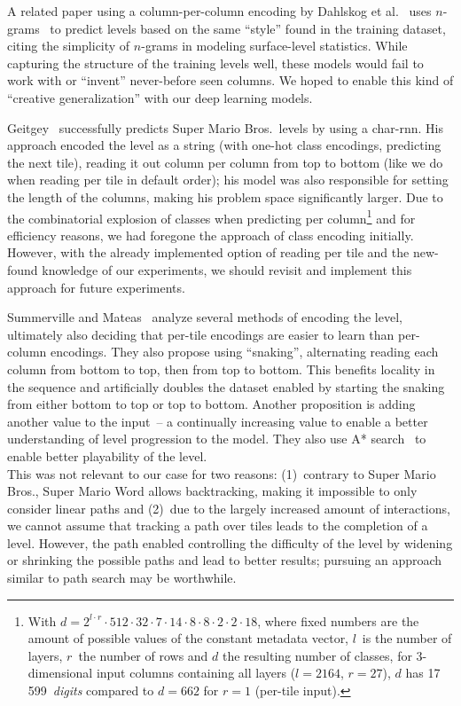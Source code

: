A related paper using a column-per-column encoding by Dahlskog et
al.~\cite{dahlskogLinearLevelsNgrams2014} uses
$n$-grams~\cite{Ngram2019} to predict levels based on the same
``style'' found in the training dataset, citing the simplicity of
$n$-grams in modeling surface-level statistics. While capturing the
structure of the training levels well, these models would fail to work
with or ``invent'' never-before seen columns. We hoped to enable this
kind of ``creative generalization'' with our deep learning models.
\medskip

Geitgey~\cite{geitgeyMachineLearningFun2018} successfully predicts
Super Mario Bros.\ levels by using a char-rnn. His approach encoded
the level as a string (with one-hot class encodings, predicting the
next tile), reading it out column per column from top to bottom (like
we do when reading per tile in default order); his model was also
responsible for setting the length of the columns, making his problem
space significantly larger. Due to the combinatorial explosion of
classes when predicting per column\footnote{With
  $d = 2^{l \cdot r} \cdot 512 \cdot 32 \cdot 7 \cdot 14 \cdot 8 \cdot 8 \cdot 2 \cdot 2 \cdot 18$, where
  fixed numbers are the amount of possible values of the constant
  metadata vector, $l$~is the number of layers, $r$~the number of rows
  and $d$ the resulting number of classes, for 3-dimensional input
  columns containing all layers ($l = 2164$, $r = 27$), $d$ has
  17\,599~\emph{digits} compared to $d = 662$ for $r = 1$ (per-tile
  input).} and for efficiency reasons, we had foregone the approach of
class encoding initially. However, with the already implemented option
of reading per tile and the new-found knowledge of our experiments, we
should revisit and implement this approach for future experiments.

Summerville and Mateas~\cite{summervilleSuperMarioString2016} analyze
several methods of encoding the level, ultimately also deciding that
per-tile encodings are easier to learn than per-column encodings. They
also propose using ``snaking'', alternating reading each column from
bottom to top, then from top to bottom. This benefits locality in the
sequence and artificially doubles the dataset enabled by starting the
snaking from either bottom to top or top to bottom. Another
proposition is adding another value to the input~-- a continually
increasing value to enable a better understanding of level progression
to the model. They also use A* search~\cite{SearchAlgorithm2019}
to enable better playability of the level. \\
This was not relevant to our case for two reasons: (1)~contrary to
Super Mario Bros., Super Mario Word allows backtracking, making it
impossible to only consider linear paths and (2)~due to the largely
increased amount of interactions, we cannot assume that tracking a
path over tiles leads to the completion of a level. However, the path
enabled controlling the difficulty of the level by widening or
shrinking the possible paths and lead to better results; pursuing an
approach similar to path search may be worthwhile.
\medskip

